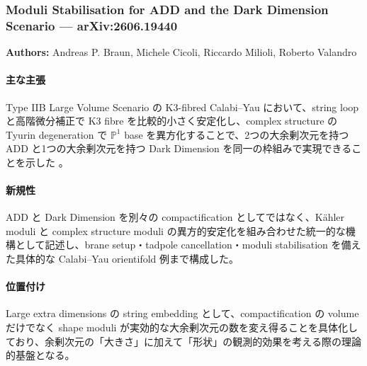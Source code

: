 \subsubsection{Moduli Stabilisation for ADD and the Dark Dimension Scenario --- arXiv:2606.19440}

\textbf{Authors:} Andreas P. Braun, Michele Cicoli, Riccardo Milioli, Roberto Valandro

\paragraph{主な主張}
Type IIB Large Volume Scenario の K3-fibred Calabi--Yau において、string loop と高階微分補正で K3 fibre を比較的小さく安定化し、complex structure の Tyurin degeneration で $\mathbb{P}^1$ base を異方化することで、2つの大余剰次元を持つ ADD と1つの大余剰次元を持つ Dark Dimension を同一の枠組みで実現できることを示した \cite{Braun:2026ADD}。

\paragraph{新規性}
ADD と Dark Dimension を別々の compactification としてではなく、K\"ahler moduli と complex structure moduli の異方的安定化を組み合わせた統一的な機構として記述し、brane setup・tadpole cancellation・moduli stabilisation を備えた具体的な Calabi--Yau orientifold 例まで構成した。

\paragraph{位置付け}
Large extra dimensions の string embedding として、compactification の volume だけでなく shape moduli が実効的な大余剰次元の数を変え得ることを具体化しており、余剰次元の「大きさ」に加えて「形状」の観測的効果を考える際の理論的基盤となる。

